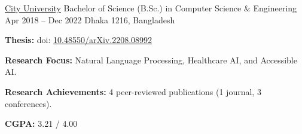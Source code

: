 

\begin{cventries}

\cventry
  {\href{https://cityuniversity.ac.bd/}{City University}} %
  {Bachelor of Science (B.Sc.) in Computer Science \& Engineering} %
  {Apr 2018 – Dec 2022} %
  {Dhaka 1216, Bangladesh} %
  {
    \begin{cvitems}
      \item \textbf{Thesis:}  doi: \href{https://doi.org/10.48550/arXiv.2208.08992}{\textcolor{Cerulean}{10.48550/arXiv.2208.08992}}
      \item \textbf{Research Focus:} Natural Language Processing, Healthcare AI, and Accessible AI.
      \item \textbf{Research Achievements:} 4 peer-reviewed publications (1 journal, 3 conferences).
      \item \textbf{CGPA:} 3.21 / 4.00
    \end{cvitems}
  }


    
    
 
\end{cventries}
